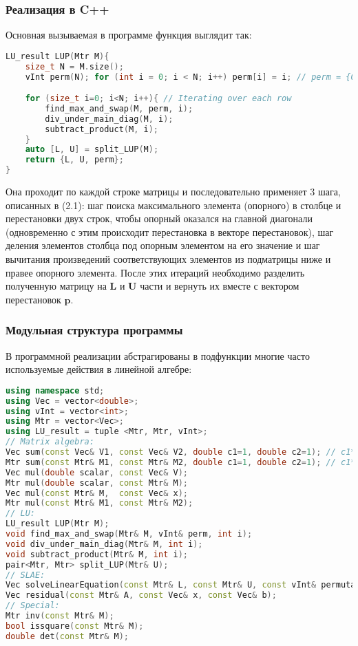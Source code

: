\subsubsection{Реализация в C++}
Основная вызываемая в программе функция выглядит так:
\begin{lstlisting}[language=c++]
LU_result LUP(Mtr M){
    size_t N = M.size();
    vInt perm(N); for (int i = 0; i < N; i++) perm[i] = i; // perm = {0,1,2,...,N-1}

    for (size_t i=0; i<N; i++){ // Iterating over each row
        find_max_and_swap(M, perm, i);
        div_under_main_diag(M, i);
        subtract_product(M, i);
    }
    auto [L, U] = split_LUP(M);
    return {L, U, perm};
}
\end{lstlisting}
Она проходит по каждой строке матрицы и последовательно применяет 3 шага, описанных в (2.1): шаг поиска максимального элемента (опорного) в столбце и перестановки двух строк, чтобы опорный оказался на главной диагонали (одновременно с этим происходит перестановка в векторе перестановок), шаг деления элементов столбца под опорным элементом на его значение и шаг вычитания произведений соответствующих элементов из подматрицы ниже и правее опорного элемента. После этих итераций необходимо разделить полученную матрицу на $\mathbf{L}$ и $\mathbf{U}$ части и вернуть их вместе с вектором перестановок $\mathbf{p}$.
\subsubsection{Модульная структура программы}
В программной реализации абстрагированы в подфункции многие часто используемые действия в линейной алгебре:
\begin{lstlisting}[language=c++]
using namespace std;
using Vec = vector<double>;
using vInt = vector<int>;
using Mtr = vector<Vec>;
using LU_result = tuple <Mtr, Mtr, vInt>;
// Matrix algebra:
Vec sum(const Vec& V1, const Vec& V2, double c1=1, double c2=1); // c1*V1 + c2*V2
Mtr sum(const Mtr& M1, const Mtr& M2, double c1=1, double c2=1); // c1*M1 + c2*M2
Vec mul(double scalar, const Vec& V);
Mtr mul(double scalar, const Mtr& M);
Vec mul(const Mtr& M,  const Vec& x);
Mtr mul(const Mtr& M1, const Mtr& M2);
// LU:
LU_result LUP(Mtr M);
void find_max_and_swap(Mtr& M, vInt& perm, int i);
void div_under_main_diag(Mtr& M, int i);
void subtract_product(Mtr& M, int i);
pair<Mtr, Mtr> split_LUP(Mtr& U);
// SLAE:
Vec solveLinearEquation(const Mtr& L, const Mtr& U, const vInt& permutation, const Vec& b);
Vec residual(const Mtr& A, const Vec& x, const Vec& b);
// Special:
Mtr inv(const Mtr& M);
bool issquare(const Mtr& M);
double det(const Mtr& M);
\end{lstlisting}
